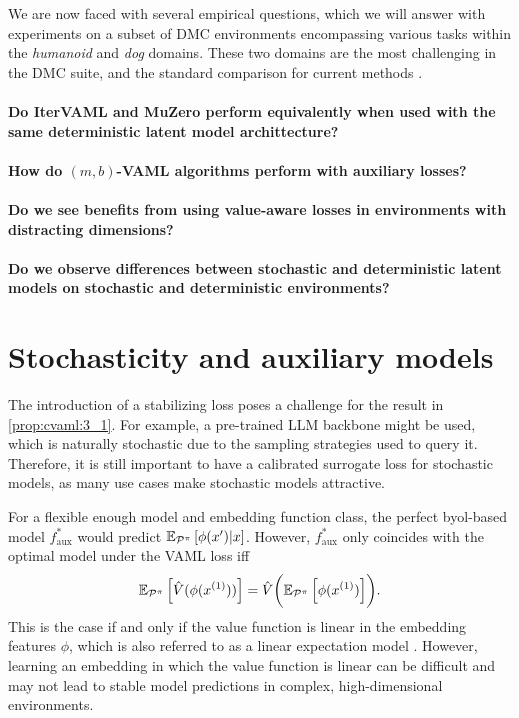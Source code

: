 We are now faced with several empirical questions, which we will answer with experiments on a subset of DMC environments \cite{tunyasuvunakool2020dmcontrol} encompassing various tasks within the \textit{humanoid} and \textit{dog} domains.
These two domains are the most challenging in the DMC suite, and the standard comparison for current methods \cite{voelcker2025mad,nauman2024bigger}.

\paragraph{Do IterVAML and MuZero perform equivalently when used with the same deterministic latent model archittecture?}

\paragraph{How do $(m,b)$-VAML algorithms perform with auxiliary losses?}

\paragraph{Do we see benefits from using value-aware losses in environments with distracting dimensions?}

\paragraph{Do we observe differences between stochastic and deterministic latent models on stochastic and deterministic environments?}

\section{Stochasticity and auxiliary models}
\label{sec:cvaml:theory_2}

The introduction of a stabilizing loss poses a challenge for the result in \autoref{prop:cvaml:3_1}.
For example, a pre-trained LLM backbone might be used, which is naturally stochastic due to the sampling strategies used to query it.
Therefore, it is still important to have a calibrated surrogate loss for stochastic models, as many use cases make stochastic models attractive.

For a flexible enough model and embedding function class, the perfect \ac{byol}-based model $f^*_\mathrm{aux}$ would predict $\mathbb{E}_{\mathcal{P}^\pi}\left[  \phi(x')| x \right]$.
However, $f^*_\mathrm{aux}$ only coincides with the optimal model under the VAML loss iff
\begin{align}
    \mathbb{E}_{\mathcal{P}^\pi}\left[  \hat{V}(\phi(x^{(1)})) \right] = \hat{V}\biggl(\mathbb{E}_{\mathcal{P}^\pi}\left[  \phi(x^{(1)}) \right]\biggr).
\end{align}
This is the case if and only if the value function is linear in the embedding features $\phi$, which is also referred to as a linear expectation model \cite{wan2019planning}.
However,  learning an embedding in which the value function is linear can be difficult and may not lead to stable model predictions in complex, high-dimensional environments.

